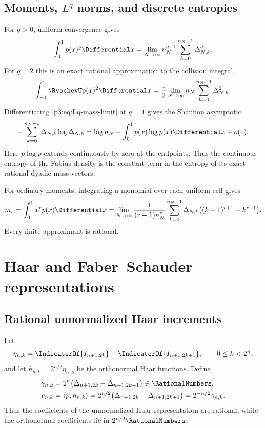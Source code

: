\documentclass[11pt]{article}
\theoremstyle{definition}
\theoremstyle{remark}
\begin{document}
\subsection[Moments, Lq norms, and discrete entropies]{Moments, $L^q$ norms, and discrete entropies}

For $q>0$, uniform convergence gives
\begin{equation}\label{p3:eq:Lq-mass-limit}
 \int_0^1p(x)^q\Differential x
 =\lim_{N\to\infty}n_N^{q-1}
  \sum_{k=0}^{n_N-1}\Delta_{N,k}^q.
\end{equation}
For $q=2$ this is an exact rational approximation to the collision integral,
\begin{equation}\label{p3:eq:up-L2-masses}
 \int_{-1}^1\RvachevUp(x)^2\Differential x
 =\frac12\lim_{N\to\infty}n_N
  \sum_{k=0}^{n_N-1}\Delta_{N,k}^2.
\end{equation}
Differentiating \eqref{p3:eq:Lq-mass-limit} at $q=1$ gives the Shannon asymptotic
\begin{equation}\label{p3:eq:mass-entropy}
 -\sum_{k=0}^{n_N-1}\Delta_{N,k}\log\Delta_{N,k}
 =\log n_N-\int_0^1p(x)\log p(x)\Differential x+o(1).
\end{equation}
Here $p\log p$ extends continuously by zero at the endpoints.  Thus the
continuous entropy of the Fabius density is the constant term in the entropy of
its exact rational dyadic mass vectors.

For ordinary moments, integrating a monomial over each uniform cell gives
\begin{equation}\label{p3:eq:moment-cell-limit-clean}
 m_r=\int_0^1x^rp(x)\Differential x
 =\lim_{N\to\infty}
 \frac{1}{(r+1)n_N^{r}}
 \sum_{k=0}^{n_N-1}\Delta_{N,k}
 \bigl((k+1)^{r+1}-k^{r+1}\bigr).
\end{equation}
Every finite approximant is rational.

\section{Haar and Faber--Schauder representations}
\label{p3:sec:haar-schauder}

\subsection{Rational unnormalized Haar increments}

Let
\begin{equation}\label{p3:eq:eta-haar}
 \eta_{n,k}
 =\IndicatorOf{I_{n+1,2k}}-\IndicatorOf{I_{n+1,2k+1}},
 \qquad 0\le k<2^n,
\end{equation}
and let $h_{n,k}=2^{n/2}\eta_{n,k}$ be the orthonormal Haar functions.
Define
\begin{align}
 \gamma_{n,k}
 &=2^n\bigl(\Delta_{n+1,2k}-\Delta_{n+1,2k+1}\bigr)\in\RationalNumbers,
 \label{p3:eq:gamma-rational}\\
 c_{n,k}
 &=\langle p,h_{n,k}\rangle
 =2^{n/2}\bigl(\Delta_{n+1,2k}-\Delta_{n+1,2k+1}\bigr)
 =2^{-n/2}\gamma_{n,k}.
 \label{p3:eq:c-orthonormal}
\end{align}
Thus the coefficients of the unnormalized Haar representation are rational,
while the orthonormal coefficients lie in $2^{n/2}\RationalNumbers$.
\end{document}
